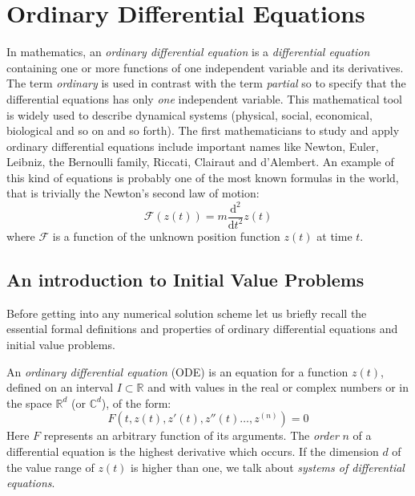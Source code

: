 %
%

\renewcommand{\arraystretch}{1.5}

\chapter{Ordinary Differential Equations}
\label{ODEs}
In mathematics, an \textit{ordinary differential equation} is a 
\textit{differential equation} containing one or more functions of one independent 
variable and its derivatives.
The term \textit{ordinary} is used in contrast with the term \textit{partial}
so to specify that the differential equations has only \textit{one} independent variable.
This mathematical tool is widely used to describe dynamical systems (physical, social,
economical, biological and so on and so forth).
The first mathematicians to study and apply ordinary differential equations
include important names like Newton, Euler, Leibniz, the Bernoulli family, 
Riccati, Clairaut and d'Alembert.
An example of this kind of equations is probably one of the most known
formulas in the world, that is trivially the Newton's second law of motion:
\begin{equation}
   \mathcal{F}(z(t))=m\dfrac{\mathrm{d}^2}{\mathrm{d}t^2}z(t)
\end{equation}
where $\mathcal{F}$ is a function of the unknown position function $z(t)$ at time $t$.

\section{An introduction to Initial Value Problems}
Before getting into any numerical solution scheme let us briefly 
recall the essential formal definitions and properties of ordinary
differential equations and initial value problems.

\begin{definition}
An \textit{ordinary differential equation} (ODE) is an equation
for a function $z(t)$, defined on an interval $I \subset \mathbb{R}$
and with values in the real or complex numbers or in the space
$\mathbb{R}^d$ (or $\mathbb{C}^d$), of the form:
\begin{equation*}
  F\left(t,z(t),z'(t),z''(t)\dots,z^{(n)}\right) = 0
\end{equation*}
Here $F$ represents an arbitrary function of its arguments.
The \textit{order} $n$ of a differential equation is the highest derivative which occurs.
If the dimension $d$ of the value range of $z(t)$ is higher than one,
we talk about \textit{systems of differential equations}.
\end{definition}

